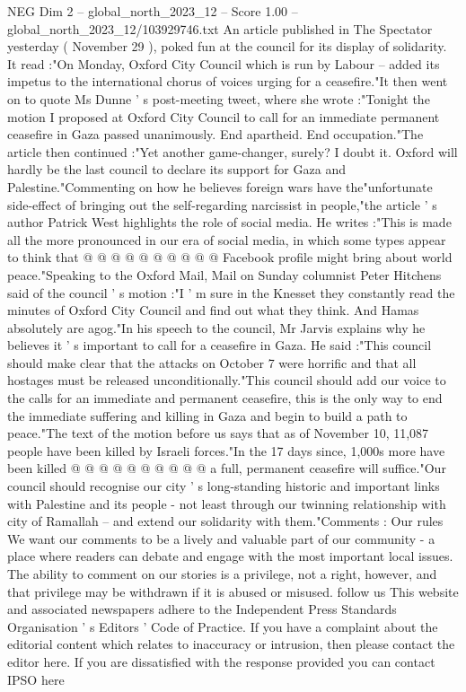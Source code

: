 \begin{textsample}{NEG Dim 2 – global\_north\_2023\_12 – Score 1.00 – global\_north\_2023\_12/103929746.txt}  \label{ex:f2_neg_330}
An article published in The Spectator yesterday ( November 29 ), poked fun at the council for its display of solidarity.
It read :"On Monday, Oxford City Council which is run by Labour -- added its impetus to the international chorus of voices urging for a ceasefire."It then went on to quote Ms Dunne ' s post-meeting tweet, where she wrote :"Tonight the motion I proposed at Oxford City Council to call for an immediate permanent ceasefire in Gaza passed unanimously.
End apartheid.
End occupation."The article then continued :"Yet another game-changer, surely?
I doubt it.
Oxford will hardly be the last council to declare its support for Gaza and Palestine."Commenting on how he believes foreign wars have the"unfortunate side-effect of bringing out the self-regarding narcissist in people,"the article ' s author Patrick West highlights the role of social media.
He writes :"This is made all the more pronounced in our era of social media, in which some types appear to think that @ @ @ @ @ @ @ @ @ @ Facebook profile might bring about world peace."Speaking to the Oxford Mail, Mail on Sunday columnist Peter Hitchens said of the council ' s motion :"I ' m sure in the Knesset they constantly read the minutes of Oxford City Council and find out what they think.
And Hamas absolutely are agog."In his speech to the council, Mr Jarvis explains why he believes it ' s important to call for a ceasefire in Gaza.
He said :"This council should make clear that the attacks on October 7 were horrific and that all hostages must be released unconditionally."This council should add our voice to the calls for an immediate and permanent ceasefire, this is the only way to end the immediate suffering and killing in Gaza and begin to build a path to peace."The text of the motion before us says that as of November 10, 11,087 people have been killed by Israeli forces."In the 17 days since, 1,000s more have been killed @ @ @ @ @ @ @ @ @ @ a full, permanent ceasefire will suffice."Our council should recognise our city ' s long-standing historic and important links with Palestine and its people - not least through our twinning relationship with city of Ramallah -- and extend our solidarity with them."Comments : Our rules We want our comments to be a lively and valuable part of our community - a place where readers can debate and engage with the most important local issues.
The ability to comment on our stories is a privilege, not a right, however, and that privilege may be withdrawn if it is abused or misused. follow us This website and associated newspapers adhere to the Independent Press Standards Organisation ' s Editors ' Code of Practice.
If you have a complaint about the editorial content which relates to inaccuracy or intrusion, then please contact the editor here.
If you are dissatisfied with the response provided you can contact IPSO here

\end{textsample}
